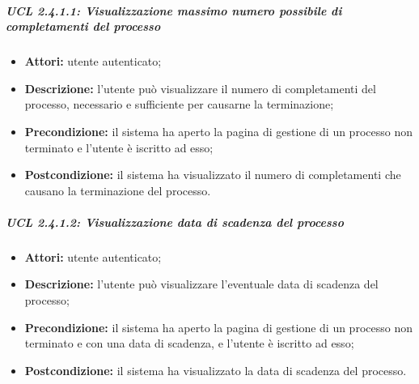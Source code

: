 \subparagraph{UCL 2.4.1.1: Visualizzazione massimo numero possibile di completamenti del processo}
\begin{itemize}
\item \textbf{Attori:} utente autenticato;
\item \textbf{Descrizione:} l'utente può visualizzare il numero di completamenti del processo, necessario e sufficiente per causarne la terminazione;
\item \textbf{Precondizione:} il sistema ha aperto la pagina di gestione di un processo non terminato e l'utente è iscritto ad esso;
\item \textbf{Postcondizione:} il sistema ha visualizzato il numero di completamenti che causano la terminazione del processo.
\end{itemize}

\subparagraph{UCL 2.4.1.2: Visualizzazione data di scadenza del processo}
\begin{itemize}
\item \textbf{Attori:} utente autenticato;
\item \textbf{Descrizione:} l'utente può visualizzare l'eventuale data di scadenza del processo;
\item \textbf{Precondizione:} il sistema ha aperto la pagina di gestione di un processo  non terminato e con una data di scadenza, e l'utente è iscritto ad esso;
\item \textbf{Postcondizione:} il sistema ha visualizzato la data di scadenza del processo.
\end{itemize}


